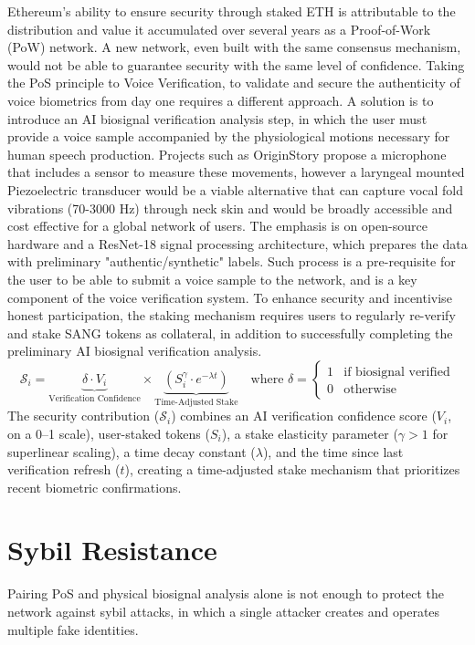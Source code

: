 \documentclass[11pt,a4paper]{article}
\begin{document}
Ethereum's ability to ensure security through staked ETH is attributable to the distribution and value it accumulated over several years as a Proof-of-Work (PoW) network.
A new network, even built with the same consensus mechanism, would not be able to guarantee security with the same level of confidence.
Taking the PoS principle to Voice Verification, to validate and secure the authenticity of voice biometrics from day one requires a different approach.
A solution is to introduce an AI biosignal verification analysis step, in which the user must provide a voice sample accompanied by the physiological motions necessary for human speech production.
Projects such as OriginStory propose a microphone that includes a sensor to measure these movements, however a laryngeal mounted Piezoelectric transducer would be a viable alternative that can capture vocal fold vibrations (70-3000 Hz) through neck skin and would be broadly accessible and cost effective for a global network of users.
The emphasis is on open-source hardware and a ResNet-18 signal processing architecture, which prepares the data with preliminary "authentic/synthetic" labels.
Such process is a pre-requisite for the user to be able to submit a voice sample to the network, and is a key component of the voice verification system.
To enhance security and incentivise honest participation, the staking mechanism requires users to regularly re-verify and stake SANG tokens as collateral, in addition to successfully completing the preliminary AI biosignal verification analysis.
\begin{equation}
    \mathcal{S}_i = \underbrace{\delta \cdot V_i}_{\text{Verification Confidence}} \times \underbrace{\left(S_i^{\gamma} \cdot e^{-\lambda t}\right)}_{\text{Time-Adjusted Stake}} \quad \text{where } \delta = \begin{cases} 
    1 & \text{if biosignal verified} \\
    0 & \text{otherwise}
    \end{cases}
    \end{equation}
    The security contribution ($\mathcal{S}_i$) combines an AI verification confidence score ($V_i$, on a 0--1 scale), user-staked tokens ($S_i$), a stake elasticity parameter ($\gamma > 1$ for superlinear scaling), a time decay constant ($\lambda$), and the time since last verification refresh ($t$), creating a time-adjusted stake mechanism that prioritizes recent biometric confirmations.
\section{Sybil Resistance}
\label{sec:methodology}
Pairing PoS and physical biosignal analysis alone is not enough to protect the network against sybil attacks, in which a single attacker creates and operates multiple fake identities.
\end{document}
